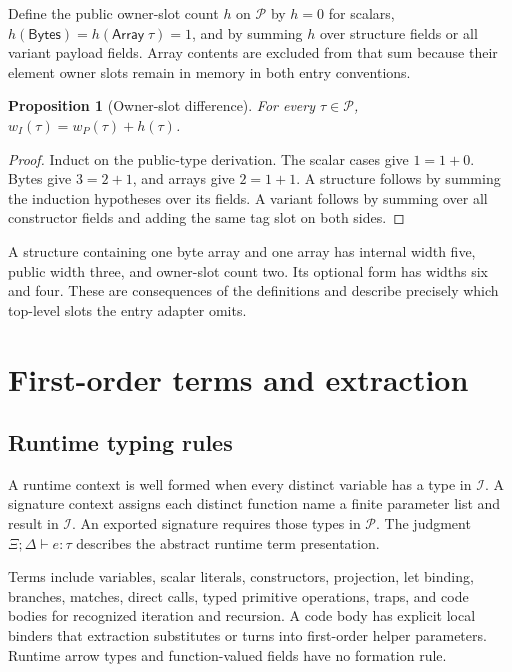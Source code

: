 \documentclass[11pt]{article}
\newcommand{\ty}[1]{\mathsf{#1}}
\newcommand{\I}{\mathcal{I}}
\newcommand{\Pp}{\mathcal{P}}
\newtheorem{proposition}[definition]{Proposition}
\begin{document}
Define the public owner-slot count $h$ on $\Pp$ by $h=0$ for scalars, $h(\ty{Bytes})=h(\ty{Array}\;\tau)=1$, and by summing $h$ over structure fields or all variant payload fields.  Array contents are excluded from that sum because their element owner slots remain in memory in both entry conventions.

\begin{proposition}[Owner-slot difference]
For every $\tau\in\Pp$, $w_I(\tau)=w_P(\tau)+h(\tau)$.
\end{proposition}
\begin{proof}
Induct on the public-type derivation.  The scalar cases give $1=1+0$.  Bytes give $3=2+1$, and arrays give $2=1+1$.  A structure follows by summing the induction hypotheses over its fields.  A variant follows by summing over all constructor fields and adding the same tag slot on both sides.
\end{proof}

A structure containing one byte array and one array has internal width five, public width three, and owner-slot count two.  Its optional form has widths six and four.  These are consequences of the definitions and describe precisely which top-level slots the entry adapter omits.

\section{First-order terms and extraction}

\subsection{Runtime typing rules}

A runtime context is well formed when every distinct variable has a type in $\I$.  A signature context assigns each distinct function name a finite parameter list and result in $\I$.  An exported signature requires those types in $\Pp$.  The judgment $\Xi;\Delta\vdash e:\tau$ describes the abstract runtime term presentation.

Terms include variables, scalar literals, constructors, projection, let binding, branches, matches, direct calls, typed primitive operations, traps, and code bodies for recognized iteration and recursion.  A code body has explicit local binders that extraction substitutes or turns into first-order helper parameters.  Runtime arrow types and function-valued fields have no formation rule.
\end{document}
